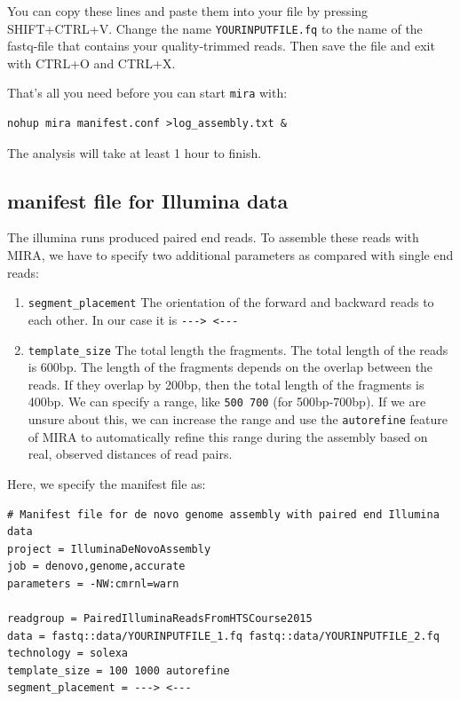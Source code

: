 \documentclass[11pt]{article}
\begin{document}
You can copy these lines and paste them into your file by pressing
SHIFT+CTRL+V. Change the name \texttt{YOURINPUTFILE.fq} to the name of the
fastq-file that contains your quality-trimmed reads. Then save the
file and exit with CTRL+O and CTRL+X.

That's all you need before you can start \texttt{mira} with:

\begin{verbatim}
nohup mira manifest.conf >log_assembly.txt &
\end{verbatim}

The analysis will take at least 1 hour to finish.

\subsection{manifest file for Illumina data}
\label{sec-1-2}

The illumina runs produced paired end reads. To assemble these reads
with MIRA, we have to specify two additional parameters as compared
with single end reads:
\begin{enumerate}
\item \texttt{segment\_placement} The orientation of the forward and backward
reads to each other. In our case it is \texttt{-{}-{}-> <-{}-{}-}
\item \texttt{template\_size} The total length the fragments. The total length of
the reads is 600bp. The length of the fragments depends on the
overlap between the reads. If they overlap by 200bp, then the total
length of the fragments is 400bp. We can specify a range, like \texttt{500
   700} (for 500bp-700bp). If we are unsure about this, we can
increase the range and use the \texttt{autorefine} feature of MIRA to
automatically refine this range during the assembly based on real,
observed distances of read pairs.
\end{enumerate}

Here, we specify the manifest file as:


\begin{verbatim}
# Manifest file for de novo genome assembly with paired end Illumina data
project = IlluminaDeNovoAssembly
job = denovo,genome,accurate
parameters = -NW:cmrnl=warn

readgroup = PairedIlluminaReadsFromHTSCourse2015
data = fastq::data/YOURINPUTFILE_1.fq fastq::data/YOURINPUTFILE_2.fq
technology = solexa
template_size = 100 1000 autorefine
segment_placement = ---> <---
\end{verbatim}
\end{document}
